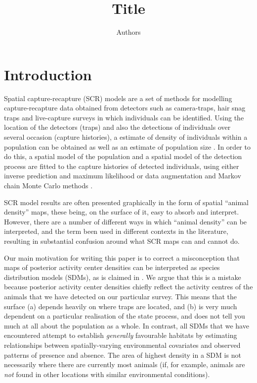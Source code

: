 \documentclass[a4paper,12pt]{article}
\begin{document}
\title{Title}
\author{Authors}
\maketitle

\begin{abstract}

\end{abstract}

\section{Introduction}

Spatial capture-recapture (SCR) models are a set of methods for modelling capture-recapture data obtained from detectors such as camera-traps, hair snag traps and live-capture surveys in which individuals can be identified. Using the location of the detectors (traps) and also the detections of individuals over several occasion (capture histories), a estimate of density of individuals within a population can be obtained as well as an estimate of population size \citep*{Borchers2012}. In order to do this, a spatial model of the population and a spatial model of the detection process are fitted to the capture histories of detected individuals, using either inverse prediction and maximum likelihood \cite{} or data augmentation and Markov chain Monte Carlo methods \cite{}. 

SCR model results are often presented graphically in the form of spatial ``animal density'' maps, these being, on the surface of it, easy to absorb and interpret. However, there are a number of different ways in which ``animal density'' can be interpreted, and the term been used in different contexts in the literature, resulting in substantial confusion around what SCR maps can and cannot do. 

Our main motivation for writing this paper is to correct a misconception that maps of posterior activity center densities can be interpreted as species distribution models (SDMs), as is claimed in \cite[e.g.][]{???}. We argue that this is a mistake because posterior activity center densities chiefly reflect the activity centres of the animals that we have detected on our particular survey. This means that the surface (a) depends heavily on where traps are located, and (b) is very much dependent on a particular realisation of the state process, and does not tell you much at all about the population as a whole. In contrast, all SDMs that we have encountered attempt to establish {\it generally} favourable habitats by estimating relationships between spatially-varying environmental covariates and observed patterns of presence and absence. The area of highest density in a SDM is not necessarily where there are currently most animals (if, for example, animals are {\it not} found in other locations with similar environmental conditions). 
\end{document}
